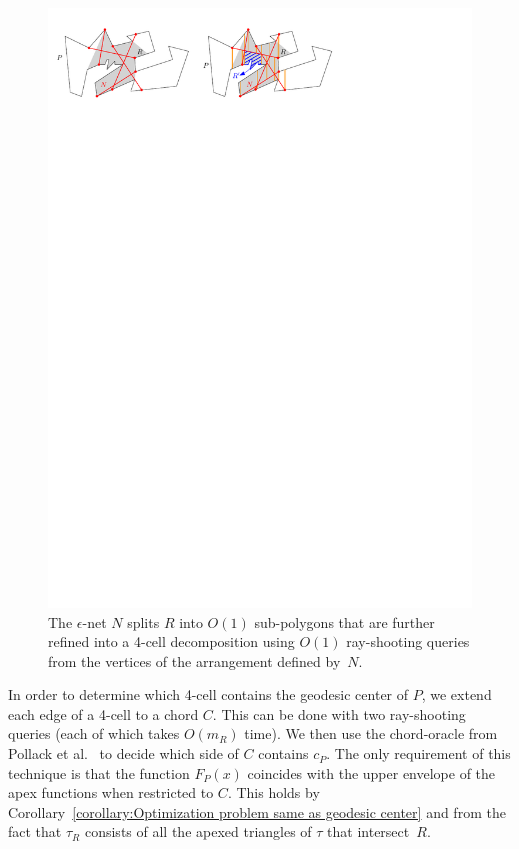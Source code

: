 \documentclass[a4paper]{article}
\newcommand{\F}[2]{\ensuremath{F_{\scriptscriptstyle #1}(#2)}}
\newcommand{\cp}{\ensuremath{c_P}}
\newcommand{\m}{\ensuremath{m_{\scriptscriptstyle R}}}
\newcommand{\tcell}{4-cell\xspace}
\begin{document}
\begin{figure}[tb]
\centering
\includegraphics{img/CuttingOfChords.pdf}

\caption{\small The $\epsilon$-net $N$ splits $R$ into $O(1)$ sub-polygons that are further refined into a \tcell decomposition using $O(1)$ ray-shooting queries from the vertices of the arrangement defined by~$N$.}
\label{fig:Cutting of Chords}
\end{figure}

In order to determine which \tcell contains the geodesic center of $P$, 
we extend each edge of a \tcell to a chord $C$. 
This can be done with two ray-shooting queries (each of which takes $O(\m)$ time).
We then use the chord-oracle from Pollack et al.~\cite[Section~3]{pollackComputingCenter} to decide which side of $C$ contains $\cp$.
The only requirement of this technique is that the function $\F{P}{x}$ coincides with the upper envelope of the apex functions when restricted to $C$.
This holds by Corollary~\ref{corollary:Optimization problem same as geodesic center} and from the fact that $\tau_R$ consists of all the apexed triangles of $\tau$ that intersect~$R$.
\end{document}
